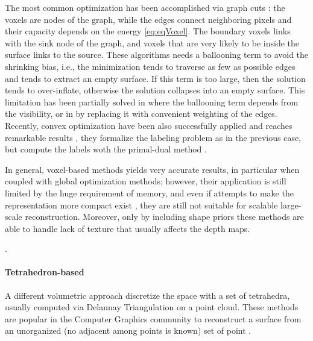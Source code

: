 The most common optimization has been accomplished via graph cuts \cite{vogiatzis2005multi,kolmogorov2002multi,hornung2006hierarchical,furukawa2006carved,mucke2011surface,hernandez2007probabilistic}: the voxels are nodes of the graph, while the edges connect neighboring pixels and their capacity depends on the energy \eqref{eq:eqVoxel}. The boundary voxels links with the sink node of the graph, and voxels that are very likely to be inside the surface links to the source.
These algorithms needs a ballooning term to avoid the shrinking bias, i.e., the minimization tends to traverse as few as possible edges and tends to extract an empty surface. If this term is too large, then the solution tends to over-inflate, otherwise the solution collapses into an empty surface.
This limitation has been partially solved in \cite{hernandez2007probabilistic} where the ballooning term depends  from the visibility, or in \cite{mucke2011surface} by replacing it with convenient weighting of the edges. 
Recently, convex optimization have been also successfully applied and reaches remarkable results
\cite{kolev2009continuous,kolev2010anisotropic,kostrikov2014probabilistic}, they formalize the labeling problem as in the previous case, but compute the labels woth the primal-dual method \cite{mehrotra1992implementation}.




In general, voxel-based methods yields very accurate results, in particular when coupled with global optimization methods; however, their application is still limited by the huge requirement of memory, and even if attempts to make the representation more compact exist \cite{steinbrucker2014volumetric,chen2013scalable,zeng2013octree}, they are still not suitable for scalable large-scale reconstruction.
Moreover, only by including shape priors these methods are able to handle lack of texture \cite{karimi2015segment} that usually affects the depth maps.


.
\paragraph{Tetrahedron-based}
\label{sec:tet-based}
A different volumetric approach discretize the space with a set of tetrahedra, usually computed via Delaunay Triangulation on a point cloud.
These methods are popular in the Computer Graphics community to reconstruct a surface from an unorganized (no adjacent among points is known) set of point \cite{amenta1999surface,amenta2001power,boissonnat1984geometric,dey2004provable,kolluri2004spectral}. 

